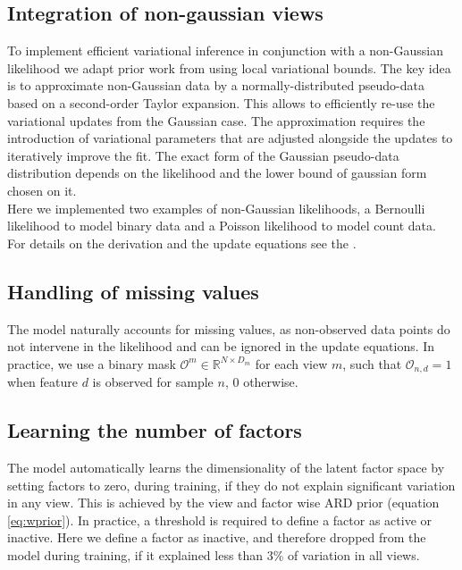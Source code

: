 \documentclass[10pt, a4paper,openany]{report}
\begin{document}
\subsection{Integration of non-gaussian views}
To implement efficient variational inference in conjunction with a non-Gaussian likelihood we adapt prior work from \cite{seeger} using local variational bounds. The key idea is to approximate non-Gaussian data by a normally-distributed pseudo-data based on a second-order Taylor expansion. This allows to efficiently re-use the variational updates from the Gaussian case. The approximation requires the introduction of variational parameters that are adjusted alongside the updates to iteratively improve the fit. The exact form of the Gaussian pseudo-data distribution depends on the likelihood and the lower bound of gaussian form chosen on it.\\
Here we implemented two examples of non-Gaussian likelihoods, a Bernoulli likelihood to model binary data and a Poisson likelihood to model count data.\\
For details on the derivation and the update equations see the .




\subsection{Handling of missing values}
The model naturally accounts for missing values, as non-observed data points do not intervene in the likelihood and can be ignored in the update equations. In practice, we use a binary mask $\mathcal{O}^m \in \mathbb{R}^{N\times D_m}$ for each view $m$, such that $\mathcal{O}_{n,d} = 1$ when feature $d$ is observed for sample $n$, 0 otherwise.

\subsection{Learning the number of factors}
The model automatically learns the dimensionality of the latent factor space by setting factors to zero, during training, if they do not explain significant variation in any view. This is achieved by the view and factor wise ARD prior (equation \ref{eq:wprior}). In practice, a threshold is required to define a factor as active or inactive. Here we define a factor as inactive, and therefore dropped from the model during training, if it explained less than 3\% of variation in all views.\\
\end{document}
